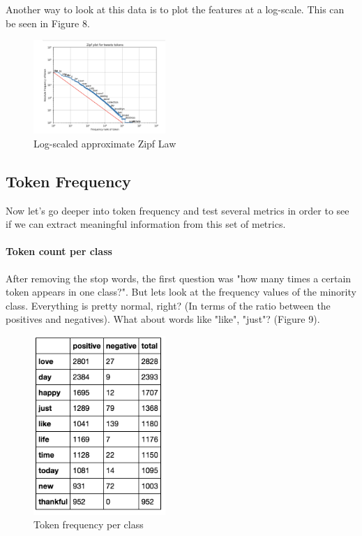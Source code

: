 \documentclass{article}
\begin{document}
	Another way to look at this data is to plot the features at a log-scale. This can be seen in Figure 8.
	
	\begin{figure}[h]
		\label{Figure 8}
		\caption{Log-scaled approximate Zipf Law}
		\includegraphics[width=50mm]{logzipf.png}
		\centering
	\end{figure}
	
	\subsection{Token Frequency}
	
	Now let's go deeper into token frequency and test several metrics in order to see if we can extract meaningful information from this set of metrics.
	
	\paragraph{Token count per class}
	
	After removing the stop words, the first question was "how many times a certain token appears in one class?". 
	But lets look at the frequency values of the minority class. Everything is pretty normal, right? (In terms of the ratio between the positives and negatives). What about words like "like", "just"? (Figure 9). 
	
	\begin{figure}[h]
		\label{Figure 9}
		\caption{Token frequency per class}
		\includegraphics[width=50mm]{freq1.png}
		\centering
	\end{figure}
	
\end{document}
